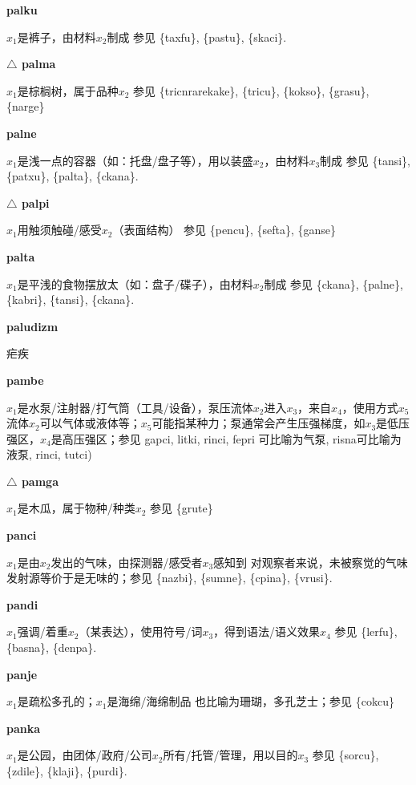 \documentclass[notitlepage,twocolumn,a4paper,10pt]{book}
\begin{document}
{\sffamily\bfseries palku}\enspace {\ttfamily\bfseries[pak]}  $x_1$是裤子，由材料$x_2$制成 \textemdash{} 参见 \{taxfu\}, \{pastu\}, \{skaci\}.

{\sffamily\bfseries $\triangle$ palma} $x_1$是棕榈树，属于品种$x_2$ \textemdash{} 参见 \{tricnrarekake\}, \{tricu\}, \{kokso\}, \{grasu\}, \{narge\}

{\sffamily\bfseries palne} $x_1$是浅一点的容器（如：托盘\slash{}盘子等），用以装盛$x_2$，由材料$x_3$制成 \textemdash{} 参见 \{tansi\}, \{patxu\}, \{palta\}, \{ckana\}.

{\sffamily\bfseries $\triangle$ palpi} $x_1$用触须触碰\slash{}感受$x_2$（表面结构） \textemdash{} 参见 \{pencu\}, \{sefta\}, \{ganse\}

{\sffamily\bfseries palta} $x_1$是平浅的食物摆放太（如：盘子\slash{}碟子），由材料$x_2$制成 \textemdash{} 参见 \{ckana\}, \{palne\}, \{kabri\}, \{tansi\}, \{ckana\}.

{\sffamily\bfseries paludizm} 疟疾

{\sffamily\bfseries pambe} $x_1$是水泵\slash{}注射器\slash{}打气筒（工具\slash{}设备），泵压流体$x_2$进入$x_3$，来自$x_4$，使用方式$x_5$ \textemdash{} 流体$x_2$可以气体或液体等；$x_5$可能指某种力；泵通常会产生压强梯度，如$x_3$是低压强区，$x_4$是高压强区；参见 {gapci}, {litki}, {rinci}, {fepri} 可比喻为气泵, {risna}可比喻为液泵, {rinci}, {tutci})

{\sffamily\bfseries $\triangle$ pamga} $x_1$是木瓜，属于物种\slash{}种类$x_2$ \textemdash{} 参见 \{grute\}

{\sffamily\bfseries panci}\enspace {\ttfamily\bfseries[pan]}  $x_1$是由$x_2$发出的气味，由探测器\slash{}感受者$x_3$感知到 \textemdash{} 对观察者来说，未被察觉的气味发射源等价于是无味的；参见 \{nazbi\}, \{sumne\}, \{cpina\}, \{vrusi\}.

{\sffamily\bfseries pandi}\enspace {\ttfamily\bfseries[pad]}  $x_1$强调\slash{}着重$x_2$（某表达），使用符号\slash{}词$x_3$，得到语法\slash{}语义效果$x_4$ \textemdash{} 参见 \{lerfu\}, \{basna\}, \{denpa\}.

{\sffamily\bfseries panje} $x_1$是疏松多孔的；$x_1$是海绵\slash{}海绵制品 \textemdash{} 也比喻为珊瑚，多孔芝士；参见 \{cokcu\}

{\sffamily\bfseries panka} $x_1$是公园，由团体\slash{}政府\slash{}公司$x_2$所有\slash{}托管\slash{}管理，用以目的$x_3$ \textemdash{} 参见 \{sorcu\}, \{zdile\}, \{klaji\}, \{purdi\}.
\end{document}
